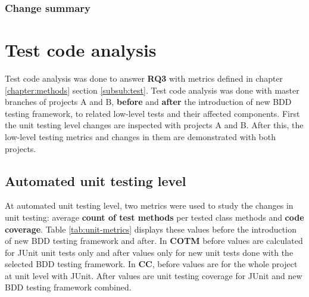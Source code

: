     \clearpage

\subsubsection{Change summary}

\section{Test code analysis}
Test code analysis was done to answer \textbf{RQ3} with metrics defined in chapter \ref{chapter:methods} section \ref{subsub:test}.
Test code analysis was done with master branches of projects A and B, \textbf{before} and \textbf{after} the introduction of new BDD testing framework, to related
low-level tests and their affected components. First the unit testing level changes are inspected with projects A and B.
After this, the low-level testing metrics and changes in them are demonstrated with both projects.

\subsection{Automated unit testing level}
\label{subsub:unit-level-metrics}
At automated unit testing level, two metrics were used to study the changes in unit testing: average \textbf{count of test methods}
per tested class methods and \textbf{code coverage}. Table \ref{tab:unit-metrics} displays these values before the introduction
of new BDD testing framework and after. In \textbf{COTM} before values are calculated for JUnit unit tests only and after
values only for new unit tests done with the selected BDD testing framework. In \textbf{CC}, before values are for the
whole project at unit level with JUnit. After values are unit testing coverage for JUnit and new BDD testing framework
combined.

